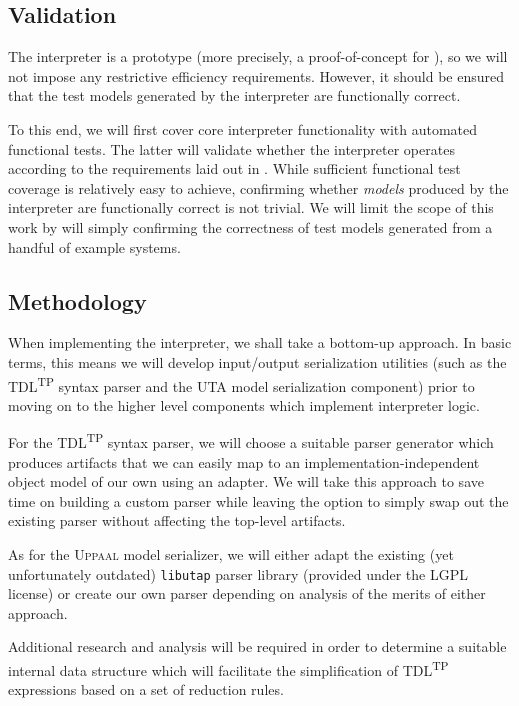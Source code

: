 \documentclass[12pt,oneside,a4paper,notitlepage]{article}
\begin{document}
	\subsection*{Validation}
	\par The interpreter is a prototype (more precisely, a proof-of-concept for \cite{tdlarticle}), so we will not impose any restrictive efficiency requirements. However, it should be ensured that the test models generated by the interpreter are functionally correct.

	\bigskip

	\par To this end, we will first cover core interpreter functionality with automated functional tests. The latter will validate whether the interpreter operates according to the requirements laid out in \cite{tdlarticle}. While sufficient functional test coverage is relatively easy to achieve, confirming whether \textit{models} produced by the interpreter are functionally correct is not trivial. We will limit the scope of this work by will simply confirming the correctness of test models generated from a handful of example systems.

	\subsection*{Methodology}
	\par When implementing the interpreter, we shall take a bottom-up approach. In basic terms, this means we will develop input/output serialization utilities (such as the TDL\textsuperscript{TP} syntax parser and the UTA model serialization component) prior to moving on to the higher level components which implement interpreter logic.

	\bigskip

	\par For the TDL\textsuperscript{TP} syntax parser, we will choose a suitable parser generator which produces artifacts that we can easily map to an implementation-independent object model of our own using an adapter. We will take this approach to save time on building a custom parser while leaving the option to simply swap out the existing parser without affecting the top-level artifacts.

	\bigskip

	\par As for the \textsc{Uppaal} model serializer, we will either adapt the existing (yet unfortunately outdated) \texttt{libutap} parser library \cite{libutapsite} (provided under the LGPL license) or create our own parser depending on analysis of the merits of either approach.

	\bigskip

	\par Additional research and analysis will be required in order to determine a suitable internal data structure which will facilitate the simplification of TDL\textsuperscript{TP} expressions based on a set of reduction rules.

	\bigskip

	\printbibliography[
		title=Sources
	]
\end{document}
